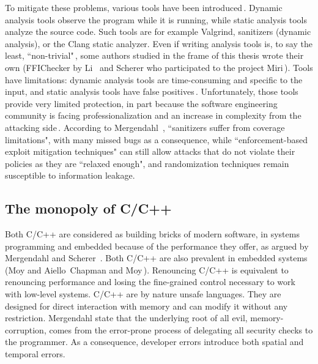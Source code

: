 \documentclass[nomenclature, english, bibtex]{kththesis}
\begin{document}
To mitigate these problems, various tools have been introduced\,\cite{mergendahl_cross-language_2022}. Dynamic analysis tools observe the program while it is running, while static analysis tools analyze the source code. Such tools are for example Valgrind, sanitizers (dynamic analysis), or the Clang static analyzer. Even if writing analysis tools is, to say the least, ``non-trivial"\,\cite{scherer_engineering_2021}, some authors studied in the frame of this thesis wrote their own (FFIChecker by Li \etal\,\cite{li_detecting_2022} and Scherer who participated to the project Miri\,\cite{noauthor_miri_2023}). Tools have limitations: dynamic analysis tools are time-consuming and specific to the input, and static analysis tools have false positives\,\cite{li_improving_2014}.
Unfortunately, those tools provide very limited protection, in part because the software engineering community is facing professionalization and an increase in complexity from the attacking side\,\cite{scherer_engineering_2021, chapman_adacore_2018}. 
According to Mergendahl \etal\,\cite{mergendahl_cross-language_2022}, ``sanitizers suffer from coverage limitations", with many missed bugs as a consequence, while ``enforcement-based exploit mitigation techniques" can still allow attacks that do not violate their policies as they are ``relaxed enough", and randomization techniques remain susceptible to information leakage.
\FloatBarrier

\subsection{The monopoly of C/C++}

Both C/C++ are considered as building bricks of modern software, in systems programming and embedded because of the performance they offer, as argued by Mergendahl \etal and Scherer \,\cite{mergendahl_cross-language_2022, scherer_engineering_2021}. Both C/C++ are also prevalent in embedded systems (Moy and Aiello\,\cite{moy_when_2020} Chapman and Moy\,\cite{chapman_adacore_2018}). Renouncing C/C++ is equivalent to renouncing performance and losing the fine-grained control necessary to work with low-level systems.
C/C++ are by nature unsafe languages. They are designed for direct interaction with memory and can modify it without any restriction. Mergendahl \etal state that the underlying root of all evil, \gls{memory-corruption}, comes from the error-prone process of delegating all security checks to the programmer. As a consequence, developer errors introduce both spatial and temporal errors.
\end{document}
